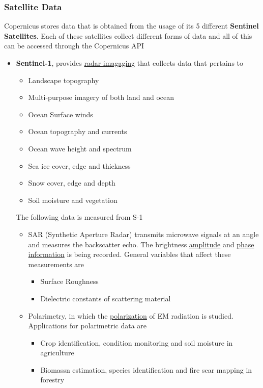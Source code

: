 \subsubsection{Satellite Data}

Copernicus stores data that is obtained from the usage of its 5 different \textbf{Sentinel Satellites}.
Each of these satellites collect different forms of data and all of this can be accessed through the Copernicus API
\begin{itemize}
    \item \textbf{Sentinel-1}, provides \underline{radar imagaging} that collects data that pertains to
    \begin{itemize}
        \item Landscape topography
        \item Multi-purpose imagery of both land and ocean
        \item Ocean Surface winds
        \item Ocean topography and currents
        \item Ocean wave height and spectrum
        \item Sea ice cover, edge and thickness
        \item Snow cover, edge and depth
        \item Soil moisture and vegetation
    \end{itemize}
    The following data is measured from S-1
    \begin{itemize}
        \item SAR (Synthetic Aperture Radar) transmits microwave signals at an angle and measures the backscatter echo. The brightness \underline{amplitude} and \underline{phase information} is being recorded. General variables that affect these measurements are
        \begin{itemize}
            \item Surface Roughness
            \item Dielectric constants of scattering material
        \end{itemize}
        \item Polarimetry, in which the \underline{polarization} of EM radiation is studied. Applications for polarimetric data are
        \begin{itemize}
            \item Crop identification, condition monitoring and soil moisture in agriculture
            \item Biomassn estimation, species identification and fire scar mapping in forestry

\end{itemize}
\end{itemize}
\end{itemize}
